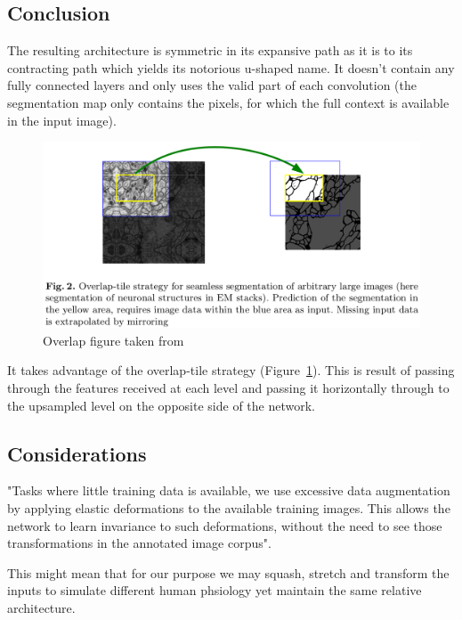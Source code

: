 \documentclass[11pt]{article}
\begin{document}
\subsection{Conclusion}

The resulting architecture is symmetric in its expansive path as it is to its contracting path which yields its notorious u-shaped name. It doesn't contain any fully connected layers and only uses the valid part of each convolution (the segmentation map only contains the pixels, for which the full context is available in the input image).

\begin{figure}[H]
    \centering
    \includegraphics[width=\linewidth]{images/overlap-tile.png}
    \caption{Overlap figure taken from~\cite{U-Net}}
    \label{fig:overlap-tile}
\end{figure}

It takes advantage of the overlap-tile strategy (Figure~\ref{fig:overlap-tile}). This is result of passing through the features received at each level and passing it horizontally through to the upsampled level on the opposite side of the network.

\subsection{Considerations}

"Tasks where little training data is available, we use excessive data augmentation by applying elastic deformations to the available training images. This allows the network to learn invariance to such deformations, without the need to see those transformations in the annotated image corpus".

This might mean that for our purpose we may squash, stretch and transform the inputs to simulate different human phsiology yet maintain the same relative architecture.
\end{document}

